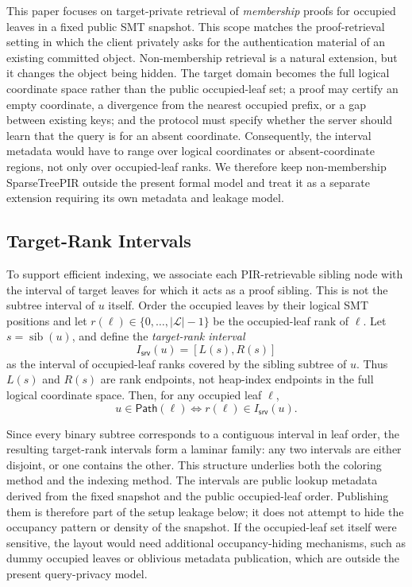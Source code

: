This paper focuses on target-private retrieval of \emph{membership} proofs for occupied leaves in a fixed public SMT snapshot. This scope matches the proof-retrieval setting in which the client privately asks for the authentication material of an existing committed object. Non-membership retrieval is a natural extension, but it changes the object being hidden. The target domain becomes the full logical coordinate space rather than the public occupied-leaf set; a proof may certify an empty coordinate, a divergence from the nearest occupied prefix, or a gap between existing keys; and the protocol must specify whether the server should learn that the query is for an absent coordinate. Consequently, the interval metadata would have to range over logical coordinates or absent-coordinate regions, not only over occupied-leaf ranks. We therefore keep non-membership SparseTreePIR outside the present formal model and treat it as a separate extension requiring its own metadata and leakage model.

\subsection{Target-Rank Intervals}

To support efficient indexing, we associate each PIR-retrievable sibling node with the interval of target leaves for which it acts as a proof sibling. This is not the subtree interval of $u$ itself. Order the occupied leaves by their logical SMT positions and let $r(\ell)\in\{0,\ldots,|\mathcal{L}|-1\}$ be the occupied-leaf rank of $\ell$. Let $s=\operatorname{sib}(u)$, and define the \emph{target-rank interval}
\[
I_{\mathsf{srv}}(u) = [L(s),R(s)]
\]
as the interval of occupied-leaf ranks covered by the sibling subtree of $u$. Thus $L(s)$ and $R(s)$ are rank endpoints, not heap-index endpoints in the full logical coordinate space. Then, for any occupied leaf $\ell$,
\[
u \in \mathsf{Path}(\ell) \Longleftrightarrow r(\ell) \in I_{\mathsf{srv}}(u).
\]

Since every binary subtree corresponds to a contiguous interval in leaf order, the resulting target-rank intervals form a laminar family: any two intervals are either disjoint, or one contains the other. This structure underlies both the coloring method and the indexing method.
The intervals are public lookup metadata derived from the fixed snapshot and the public occupied-leaf order. Publishing them is therefore part of the setup leakage below; it does not attempt to hide the occupancy pattern or density of the snapshot. If the occupied-leaf set itself were sensitive, the layout would need additional occupancy-hiding mechanisms, such as dummy occupied leaves or oblivious metadata publication, which are outside the present query-privacy model.

